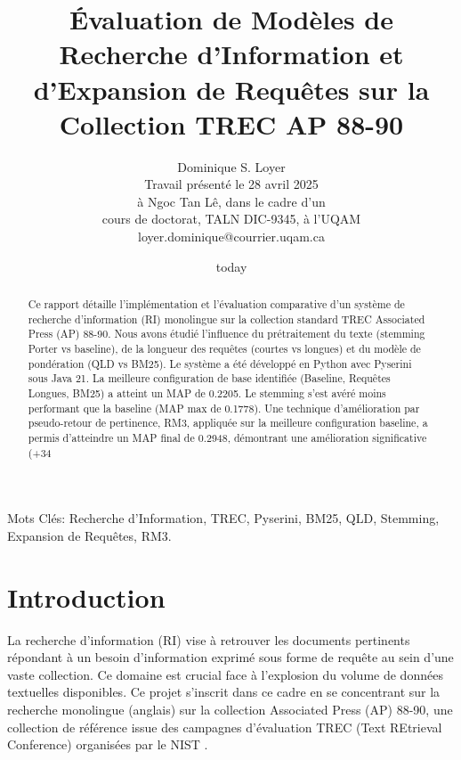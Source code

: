 \documentclass[11pt,a4paper]{article}
\title{Évaluation de Modèles de Recherche d'Information et d'Expansion de Requêtes sur la Collection TREC AP 88-90} %
\author{Dominique S. Loyer\\
  Travail présenté le 28 avril 2025 \\
  à Ngoc Tan Lê, dans le cadre d'un \\
  cours de doctorat, TALN DIC-9345, à l'UQAM \\
  loyer.dominique@courrier.uqam.ca \\}
\date{today}
\begin{document}
\maketitle

\begin{abstract}
    

Ce rapport détaille l'implémentation et l'évaluation comparative d'un système de recherche d'information (RI) monolingue sur la collection standard TREC Associated Press (AP) 88-90. Nous avons étudié l'influence du prétraitement du texte (stemming Porter vs baseline), de la longueur des requêtes (courtes vs longues) et du modèle de pondération (QLD vs BM25). Le système a été développé en Python avec Pyserini sous Java 21. La meilleure configuration de base identifiée (Baseline, Requêtes Longues, BM25) a atteint un MAP de 0.2205. Le stemming s'est avéré moins performant que la baseline (MAP max de 0.1778). Une technique d'amélioration par pseudo-retour de pertinence, RM3, appliquée sur la meilleure configuration baseline, a permis d'atteindre un MAP final de 0.2948, démontrant une amélioration significative (+34%
\end{abstract}

Mots Clés: Recherche d'Information, TREC, Pyserini, BM25, QLD, Stemming, Expansion de Requêtes, RM3.

\section{Introduction}
La recherche d'information (RI) vise à retrouver les documents pertinents répondant à un besoin d'information exprimé sous forme de requête au sein d'une vaste collection. Ce domaine est crucial face à l'explosion du volume de données textuelles disponibles. Ce projet s'inscrit dans ce cadre en se concentrant sur la recherche monolingue (anglais) sur la collection Associated Press (AP) 88-90, une collection de référence issue des campagnes d'évaluation TREC (Text REtrieval Conference) organisées par le NIST \citep{Harman1995TREC}. %
\end{document}
